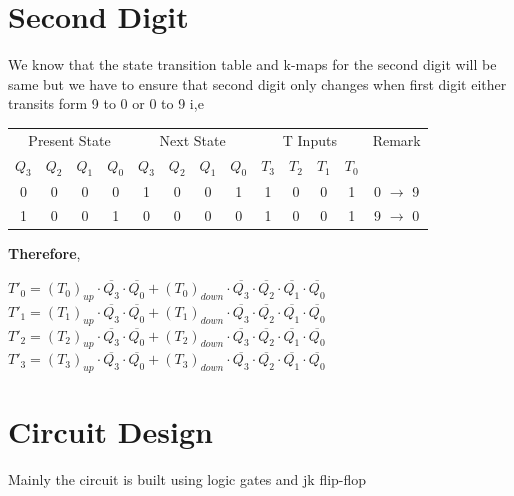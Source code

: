 \documentclass{article}
\begin{document}
    \section{\textbf{Second Digit}}
    We know that the state transition table and k-maps for the second digit will be same but we have to ensure that second digit only changes when first digit either transits form 9 to 0 or 0 to 9
    i,e
    \begin{center}
     \begin{tabular}{cccc|cccc|cccc|c}
    \toprule
    \multicolumn{4}{c|}{Present State} & \multicolumn{4}{c|}{Next State} & \multicolumn{4}{c|}{T Inputs} & Remark \\
    $Q_3$ & $Q_2$ & $Q_1$ & $Q_0$ & $Q_3$ & $Q_2$ & $Q_1$ & $Q_0$ & $T_3$ & $T_2$ & $T_1$ & $T_0$ & \\
    \midrule
    0 & 0 & 0 & 0 & 1 & 0 & 0 & 1 & 1 & 0 & 0 & 1 & 0 $\rightarrow$ 9 \\
    1 & 0 & 0 & 1 & 0 & 0 & 0 & 0 & 1 & 0 & 0 & 1 & 9 $\rightarrow$ 0 \\
    
    \bottomrule
    \end{tabular}   
    \end{center}
    \textbf{Therefore},\\
    \begin{center}
        $T'_0=(T_0)_{up} \cdot \overline{Q_3} \cdot \overline{Q_0} + (T_0)_{down} \cdot \overline{Q_3} \cdot \overline{Q_2} \cdot \overline{Q_1} \cdot \overline{Q_0}$\\
        $T'_1=(T_1)_{up} \cdot \overline{Q_3} \cdot \overline{Q_0} + (T_1)_{down} \cdot \overline{Q_3} \cdot \overline{Q_2} \cdot \overline{Q_1} \cdot \overline{Q_0}$\\
        $T'_2=(T_2)_{up} \cdot \overline{Q_3} \cdot \overline{Q_0} + (T_2)_{down} \cdot \overline{Q_3} \cdot \overline{Q_2} \cdot \overline{Q_1} \cdot \overline{Q_0}$\\
        $T'_3=(T_3)_{up} \cdot \overline{Q_3} \cdot \overline{Q_0} + (T_3)_{down} \cdot \overline{Q_3} \cdot \overline{Q_2} \cdot \overline{Q_1} \cdot \overline{Q_0}$\\
    \end{center}
    
    \section{Circuit Design}
    Mainly the circuit is built using logic gates and jk flip-flop
\end{document}
